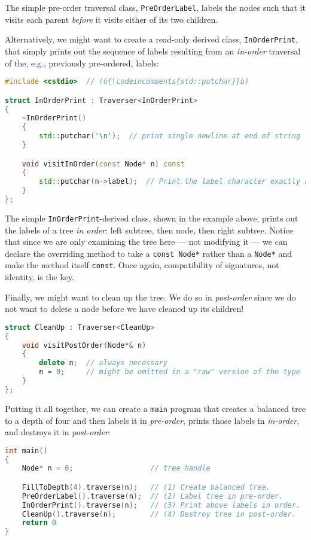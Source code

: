 \noindent The simple pre-order traversal class, \texttt{PreOrderLabel}, labels the
nodes such that it visits each parent \emph{before} it visits either of
its two children.

Alternatively, we might want to create a read-only derived class,
\texttt{InOrderPrint}, that simply prints out the sequence of labels
resulting from an \emph{in-order} traversal of the, e.g., previously
pre-ordered, labels:

\begin{lstlisting}[language=C++]
#include <cstdio>  // (ù{\codeincomments{std::putchar}}ù)

struct InOrderPrint : Traverser<InOrderPrint>
{
    ~InOrderPrint()
    {
        std::putchar('\n');  // print single newline at end of string
    }

    void visitInOrder(const Node* n) const
    {
        std::putchar(n->label);  // Print the label character exactly as is.
    }
};
\end{lstlisting}
    
\noindent The simple \texttt{InOrderPrint}-derived class, shown in the example above, prints out the
labels of a tree \emph{in order}: left subtree, then node, then right
subtree. Notice that since we are only examining the tree here --- not
modifying it --- we can declare the overriding method to take a
\texttt{const}~\texttt{Node*} rather than a \texttt{Node*} and make the
method itself \texttt{const}. Once again, compatibility of signatures,
not identity, is the key.

Finally, we might want to clean up the tree. We do so in
\emph{post-order} since we do not want to delete a node before we have
cleaned up its children!

\begin{lstlisting}[language=C++]
struct CleanUp : Traverser<CleanUp>
{
    void visitPostOrder(Node*& n)
    {
        delete n;  // always necessary
        n = 0;     // might be omitted in a "raw" version of the type
    }
};
\end{lstlisting}
    
\noindent Putting it all together, we can create a \texttt{main} program that
creates a balanced tree to a depth of four and then labels it in
\emph{pre-order}, prints those labels in \emph{in-order}, and destroys
it in \emph{post-order}:

\begin{lstlisting}[language=C++]
int main()
{
    Node* n = 0;                  // tree handle

    FillToDepth(4).traverse(n);   // (1) Create balanced tree.
    PreOrderLabel().traverse(n);  // (2) Label tree in pre-order.
    InOrderPrint().traverse(n);   // (3) Print above labels in order.
    CleanUp().traverse(n);        // (4) Destroy tree in post-order.
    return 0
}
\end{lstlisting}
    

